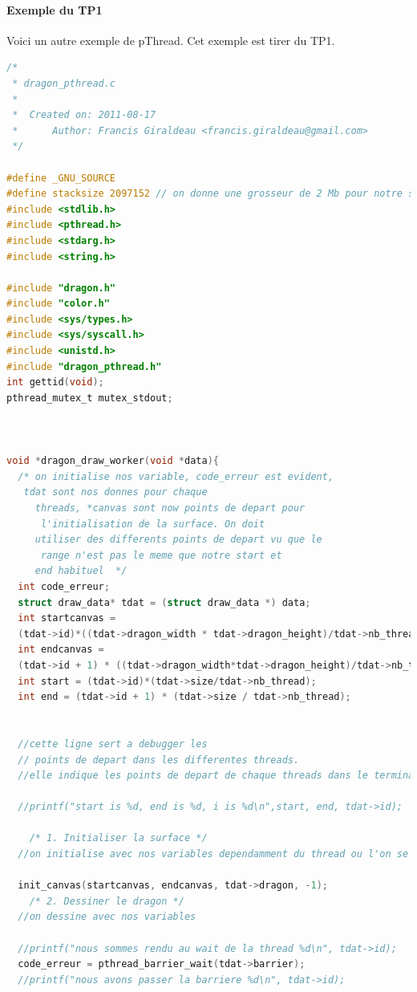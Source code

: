 \documentclass[oneside]{book}
\begin{document}
\paragraph{Exemple du TP1}
Voici un autre exemple de pThread. Cet exemple est tirer du TP1.

\begin{lstlisting}[language=C]
/*
 * dragon_pthread.c
 *
 *  Created on: 2011-08-17
 *      Author: Francis Giraldeau <francis.giraldeau@gmail.com>
 */

#define _GNU_SOURCE
#define stacksize 2097152 // on donne une grosseur de 2 Mb pour notre stack, sa devrait etre suffisant
#include <stdlib.h>
#include <pthread.h>
#include <stdarg.h>
#include <string.h>

#include "dragon.h"
#include "color.h"
#include <sys/types.h>
#include <sys/syscall.h>
#include <unistd.h>
#include "dragon_pthread.h"
int gettid(void);
pthread_mutex_t mutex_stdout;



void *dragon_draw_worker(void *data){
  /* on initialise nos variable, code_erreur est evident,
   tdat sont nos donnes pour chaque 
	 threads, *canvas sont now points de depart pour
	  l'initialisation de la surface. On doit 
	 utiliser des differents points de depart vu que le
	  range n'est pas le meme que notre start et
	 end habituel  */
  int code_erreur;
  struct draw_data* tdat = (struct draw_data *) data;
  int startcanvas = 
  (tdat->id)*((tdat->dragon_width * tdat->dragon_height)/tdat->nb_thread);
  int endcanvas = 
  (tdat->id + 1) * ((tdat->dragon_width*tdat->dragon_height)/tdat->nb_thread);
  int start = (tdat->id)*(tdat->size/tdat->nb_thread);
  int end = (tdat->id + 1) * (tdat->size / tdat->nb_thread);


  //cette ligne sert a debugger les
  // points de depart dans les differentes threads.
  //elle indique les points de depart de chaque threads dans le terminal
  
  //printf("start is %d, end is %d, i is %d\n",start, end, tdat->id);
  
	/* 1. Initialiser la surface */
  //on initialise avec nos variables dependamment du thread ou l'on se situe
  
  init_canvas(startcanvas, endcanvas, tdat->dragon, -1);
	/* 2. Dessiner le dragon */
  //on dessine avec nos variables

  //printf("nous sommes rendu au wait de la thread %d\n", tdat->id);
  code_erreur = pthread_barrier_wait(tdat->barrier);
  //printf("nous avons passer la barriere %d\n", tdat->id);


\end{lstlisting}
\end{document}
